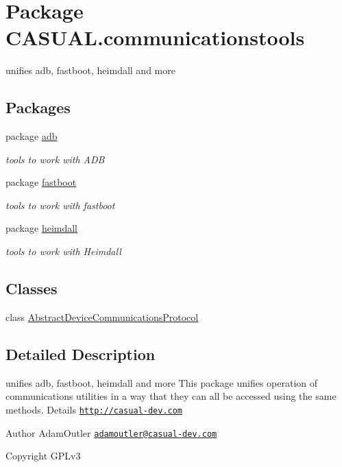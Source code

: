 \hypertarget{namespace_c_a_s_u_a_l_1_1communicationstools}{\section{Package C\-A\-S\-U\-A\-L.\-communicationstools}
\label{namespace_c_a_s_u_a_l_1_1communicationstools}
}


unifies adb, fastboot, heimdall and more  


\subsection*{Packages}
\begin{DoxyCompactItemize}
\item 
package \hyperlink{namespace_c_a_s_u_a_l_1_1communicationstools_1_1adb}{adb}
\begin{DoxyCompactList}\small\item\em tools to work with A\-D\-B \end{DoxyCompactList}\item 
package \hyperlink{namespace_c_a_s_u_a_l_1_1communicationstools_1_1fastboot}{fastboot}
\begin{DoxyCompactList}\small\item\em tools to work with fastboot \end{DoxyCompactList}\item 
package \hyperlink{namespace_c_a_s_u_a_l_1_1communicationstools_1_1heimdall}{heimdall}
\begin{DoxyCompactList}\small\item\em tools to work with Heimdall \end{DoxyCompactList}\end{DoxyCompactItemize}
\subsection*{Classes}
\begin{DoxyCompactItemize}
\item 
class \hyperlink{class_c_a_s_u_a_l_1_1communicationstools_1_1_abstract_device_communications_protocol}{Abstract\-Device\-Communications\-Protocol}
\end{DoxyCompactItemize}


\subsection{Detailed Description}
unifies adb, fastboot, heimdall and more This package unifies operation of communications utilities in a way that they can all be accessed using the same methods. Details \href{http://casual-dev.com}{\tt http\-://casual-\/dev.\-com} \begin{DoxyAuthor}{Author}
Adam\-Outler \href{mailto:adamoutler@casual-dev.com}{\tt adamoutler@casual-\/dev.\-com} 
\end{DoxyAuthor}
\begin{DoxyCopyright}{Copyright}
G\-P\-Lv3 
\end{DoxyCopyright}
